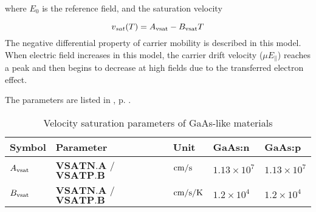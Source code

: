 \documentclass[oneside,12pt]{cgd_book}
\begin{document}
where $E_{0}$ is the reference field, and the saturation velocity
\par
\begin{equation}
v_{sat} (T) = A_{\rm vsat} - B_{\rm vsat} T
\end{equation}
The negative differential property of carrier mobility is described in this model. When electric field
          increases in this model, the carrier drift velocity ($\mu E_{\parallel}$) reaches
          a peak and then begins to decrease at high fields due to the transferred electron effect.
\par
The parameters are listed in ,
p. \pageref{tab:Equation:Vsat:GaAs:Param}.
\par
\begin{longtable}{lllll}
\caption{\label{tab:Equation:Vsat:GaAs:Param}Velocity saturation parameters of GaAs-like materials} \\
\hline
 Symbol
& Parameter
& Unit
& GaAs:n
& GaAs:p\\
\hline
 $A_{\rm vsat}$
& $\mathbf{VSATN.A}$ / $\mathbf{VSATP.B}$
& $\text{cm}\text{/}\text{s}$
& $1.13\times10^{7}$
& $1.13\times10^{7}$
\\
 $B_{\rm vsat}$
& $\mathbf{VSATN.A}$ / $\mathbf{VSATP.B}$
& $\text{cm}\text{/}\text{s}\text{/}\text{K}$
& $1.2\times10^{4}$
& $1.2\times10^{4}$\\
\end{longtable}
\end{document}
